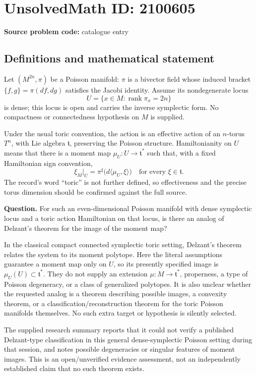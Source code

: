 \documentclass[11pt]{article}
\begin{document}
\section*{UnsolvedMath ID: 2100605}
\textbf{Source problem code:} catalogue entry
\subsection{Definitions and mathematical statement}
Let $(M^{2n},\pi)$ be a Poisson manifold: $\pi$ is a bivector field whose induced bracket $\{f,g\}=\pi(df,dg)$ satisfies the Jacobi identity. Assume its nondegenerate locus
\[
 U=\{x\in M:\operatorname{rank}\pi_x=2n\}
\]
is dense; this locus is open and carries the inverse symplectic form. No compactness or connectedness hypothesis on $M$ is supplied.

Under the usual toric convention, the action is an effective action of an $n$-torus $T^n$, with Lie algebra $\mathfrak t$, preserving the Poisson structure. Hamiltonianity on $U$ means that there is a moment map $\mu_U:U\to\mathfrak t^*$ such that, with a fixed Hamiltonian sign convention,
\[
 \xi_M|_U=\pi^{\sharp}\bigl(d\langle\mu_U,\xi\rangle\bigr)
 \quad\text{for every }\xi\in\mathfrak t.
\]
The record's word ``toric'' is not further defined, so effectiveness and the precise torus dimension should be confirmed against the full source.

\textbf{Question.} For such an even-dimensional Poisson manifold with dense symplectic locus and a toric action Hamiltonian on that locus, is there an analog of Delzant's theorem for the image of the moment map?

In the classical compact connected symplectic toric setting, Delzant's theorem relates the system to its moment polytope. Here the literal assumptions guarantee a moment map only on $U$, so its presently specified image is $\mu_U(U)\subset\mathfrak t^*$. They do not supply an extension $\mu:M\to\mathfrak t^*$, properness, a type of Poisson degeneracy, or a class of generalized polytopes. It is also unclear whether the requested analog is a theorem describing possible images, a convexity theorem, or a classification/reconstruction theorem for the toric Poisson manifolds themselves. No such extra target or hypothesis is silently selected.

The supplied research summary reports that it could not verify a published Delzant-type classification in this general dense-symplectic Poisson setting during that session, and notes possible degeneracies or singular features of moment images. This is an open/unverified evidence assessment, not an independently established claim that no such theorem exists.
\end{document}
